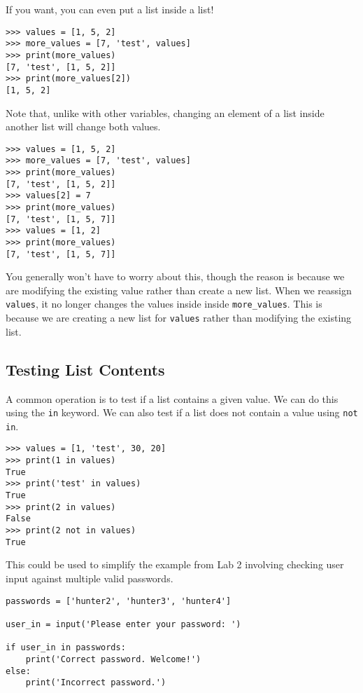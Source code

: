 \documentclass[11pt]{cselabheader}
\begin{document}
If you want, you can even put a list inside a list!

\begin{lstlisting}[style=ipython]
>>> values = [1, 5, 2]
>>> more_values = [7, 'test', values]
>>> print(more_values)
[7, 'test', [1, 5, 2]]
>>> print(more_values[2])
[1, 5, 2]
\end{lstlisting}

Note that, unlike with other variables, changing an element of a list inside another list will change both values.

\begin{lstlisting}[style=ipython]
>>> values = [1, 5, 2]
>>> more_values = [7, 'test', values]
>>> print(more_values)
[7, 'test', [1, 5, 2]]
>>> values[2] = 7
>>> print(more_values)
[7, 'test', [1, 5, 7]]
>>> values = [1, 2]
>>> print(more_values)
[7, 'test', [1, 5, 7]]
\end{lstlisting}

You generally won't have to worry about this, though the reason is because we are modifying the existing value rather than create a new list. When we reassign \lstinline{values}, it no longer changes the values inside inside \lstinline{more_values}. This is because we are creating a new list for \lstinline{values} rather than modifying the existing list.

\subsection{Testing List Contents}
A common operation is to test if a list contains a given value. We can do this using the \lstinline{in} keyword. We can also test if a list does not contain a value using \lstinline{not in}.

\begin{lstlisting}[style=ipython]
>>> values = [1, 'test', 30, 20]
>>> print(1 in values)
True
>>> print('test' in values)
True
>>> print(2 in values)
False
>>> print(2 not in values)
True
\end{lstlisting}

This could be used to simplify the example from Lab 2 involving checking user input against multiple valid passwords.

\begin{lstlisting}[style=python]
passwords = ['hunter2', 'hunter3', 'hunter4']

user_in = input('Please enter your password: ')

if user_in in passwords:
    print('Correct password. Welcome!')
else:
    print('Incorrect password.')
\end{lstlisting}
\end{document}

